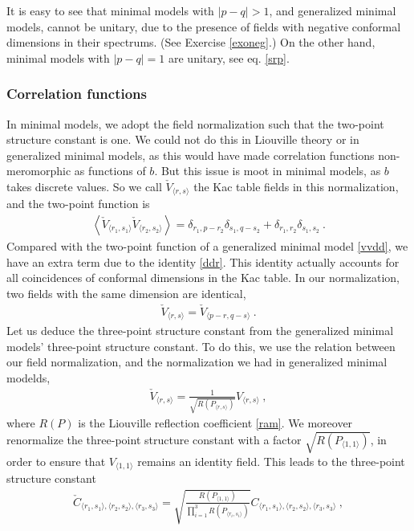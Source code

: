 \documentclass[12pt, a4paper, notitlepage, twoside]{report}
\numberwithin{equation}{section}
\theoremstyle{break}
\begin{document}
It is easy to see that minimal models with $|p-q|>1$, and generalized minimal models, cannot be unitary, due to the presence of fields with negative conformal dimensions in their spectrums. (See Exercise \ref{exoneg}.)
On the other hand, minimal models with $|p-q|=1$ are unitary, see eq. \eqref{srp}.

\subsubsection{Correlation functions}

In minimal models, we adopt the field normalization such that the two-point structure constant is one. We could not do this in Liouville theory or in generalized minimal models, as this would have made correlation functions non-meromorphic as functions of $b$. But this issue is moot in minimal models, as $b$ takes discrete values. So we call $\check{V}_{\langle r,s\rangle}$ the Kac table fields in this normalization, and the two-point function is 
\begin{align}
 \boxed{\left\langle \check{V}_{\langle r_1,s_1 \rangle} \check{V}_{\langle r_2,s_2 \rangle} \right\rangle = \delta_{r_1,p-r_2}\delta_{s_1,q-s_2} + \delta_{r_1,r_2} \delta_{s_1,s_2}} \ .
\end{align}
Compared with the two-point function of a generalized minimal model \eqref{vvdd}, we have an extra term due to the identity \eqref{ddr}. This identity actually accounts for all coincidences of conformal dimensions in the Kac table. In our normalization, two fields with the same dimension are identical, 
\begin{align}
 \check{V}_{\langle r,s \rangle} = \check{V}_{\langle p-r,q-s \rangle}\ .
  \label{vvr}
\end{align}
Let us deduce the three-point structure constant from the generalized minimal models' three-point structure constant. To do this, we use the relation between our field normalization, and the normalization we had in generalized minimal modelds,
\begin{align}
 \check{V}_{\langle r,s \rangle} = \frac{1}{\sqrt{R(P_{\langle r,s \rangle})}} V_{\langle r,s \rangle}\ , 
\end{align}
where $R(P)$ is the Liouville reflection coefficient \eqref{ram}. We moreover renormalize the three-point structure constant with a factor $\sqrt{R(P_{\langle 1,1 \rangle})}$, in order to ensure that $V_{\langle 1,1\rangle}$ remains an identity field. This leads to the three-point structure constant 
\begin{align}
 \check{C}_{\langle r_1,s_1\rangle ,\langle r_2,s_2\rangle ,\langle r_3,s_3 \rangle} = \sqrt{\frac{R(P_{\langle 1,1 \rangle})}{\prod_{i=1}^3 R(P_{\langle r_i,s_i \rangle})}}  C_{\langle r_1,s_1\rangle ,\langle r_2,s_2\rangle ,\langle r_3,s_3 \rangle}\ ,
\label{tcc}
\end{align}
\end{document}
